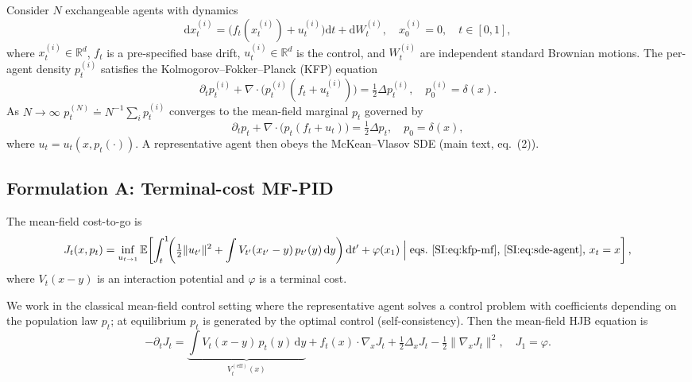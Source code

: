\documentclass[11pt,onecolumn]{article}
\newcommand{\dd}{\mathrm{d}}
\newcommand{\Rbb}{\mathbb{R}}
\newcommand{\Veff}{V^{(\mathrm{eff})}}
\begin{document}
Consider $N$ exchangeable agents with dynamics
\begin{equation}
  \dd x_t^{(i)}
  = \bigl(f_t(x_t^{(i)}) + u_t^{(i)}\bigr)\dd t + \dd W_t^{(i)},
  \quad x_0^{(i)} = 0,
  \quad t\in[0,1],
  \label{SI:eq:sde-agent}
\end{equation}
where $x_t^{(i)}\in\Rbb^d$, $f_t$ is a pre-specified base drift, $u_t^{(i)}\in\Rbb^d$ is the control, and $W_t^{(i)}$ are independent standard Brownian motions. The per-agent density $p_t^{(i)}$ satisfies the Kolmogorov--Fokker--Planck (KFP) equation
\begin{equation}
  \partial_t p_t^{(i)}
  + \nabla\cdot\bigl(p_t^{(i)}(f_t + u_t^{(i)})\bigr)
  = \tfrac{1}{2}\Delta p_t^{(i)},
  \quad p_0^{(i)} = \delta(x).
  \label{SI:eq:kfp-per-agent}
\end{equation}
As $N\to\infty$ $p_t^{(N)} \doteq  N^{-1}\sum_i p_t^{(i)}$ converges to the mean-field marginal $p_t$ governed by
\begin{equation}
  \partial_t p_t + \nabla\cdot\bigl(p_t(f_t + u_t)\bigr)
  = \tfrac{1}{2}\Delta p_t,
  \quad p_0 = \delta(x),
  \label{SI:eq:kfp-mf}
\end{equation}
where $u_t = u_t(x, p_t(\cdot))$. A representative agent then obeys the McKean--Vlasov SDE
(main text, eq.~(2)).

\subsection{Formulation A: Terminal-cost MF-PID}
\label{SI:theory:terminal-cost}

The mean-field cost-to-go is
\begin{equation}
  J_t(x, p_t) = \inf_{u_{t\to1}} \mathbb{E}\!\left[
    \int_t^1\!\!\left(\tfrac{1}{2}\|u_{t'}\|^2
    + \int V_{t'}(x_{t'}-y)\,p_{t'}(y)\,\dd y\right)\dd t'
    + \varphi(x_1)
    \;\Big|\;
    \text{eqs.~\eqref{SI:eq:kfp-mf}, \eqref{SI:eq:sde-agent}},\,
    x_t = x
  \right],
  \label{SI:eq:cost-J}
\end{equation}
where $V_t(x-y)$ is an interaction potential and $\varphi$ is a terminal cost.


We work in the classical mean-field control setting where the representative agent solves a control problem with coefficients depending on the population law $p_t$; at equilibrium $p_t$ is generated by the optimal control (self-consistency). Then the mean-field HJB equation is
\begin{equation}
  -\partial_t J_t
  = \underbrace{\int V_t(x-y)\,p_t(y)\,\dd y}_{\Veff_t(x)}
    + f_t(x)\cdot\nabla_x J_t
    + \tfrac{1}{2}\Delta_x J_t
    - \tfrac{1}{2}\|\nabla_x J_t\|^2,
  \quad J_1 = \varphi.
  \label{SI:eq:hjb-mf}
\end{equation}
\end{document}
